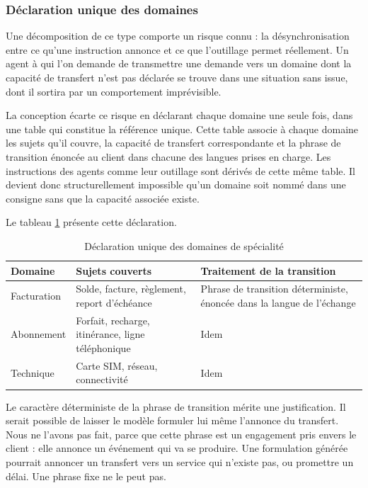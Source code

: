 \subsubsection{Déclaration unique des domaines}

Une décomposition de ce type comporte un risque connu : la désynchronisation entre ce qu'une instruction annonce et ce que l'outillage permet réellement. Un agent à qui l'on demande de transmettre une demande vers un domaine dont la capacité de transfert n'est pas déclarée se trouve dans une situation sans issue, dont il sortira par un comportement imprévisible.

La conception écarte ce risque en déclarant chaque domaine une seule fois, dans une table qui constitue la référence unique. Cette table associe à chaque domaine les sujets qu'il couvre, la capacité de transfert correspondante et la phrase de transition énoncée au client dans chacune des langues prises en charge. Les instructions des agents comme leur outillage sont dérivés de cette même table. Il devient donc structurellement impossible qu'un domaine soit nommé dans une consigne sans que la capacité associée existe.

Le tableau \ref{tab:domaines} présente cette déclaration.

\begin{table}[H]
\centering
\renewcommand{\arraystretch}{1.25}
\begin{tabular}{|p{3.0cm}|p{6.2cm}|p{5.3cm}|}
\hline
\textbf{Domaine} & \textbf{Sujets couverts} & \textbf{Traitement de la transition} \\
\hline
Facturation & Solde, facture, règlement, report d'échéance & Phrase de transition déterministe, énoncée dans la langue de l'échange \\
\hline
Abonnement & Forfait, recharge, itinérance, ligne téléphonique & Idem \\
\hline
Technique & Carte SIM, réseau, connectivité & Idem \\
\hline
\end{tabular}
\caption{Déclaration unique des domaines de spécialité}
\label{tab:domaines}
\end{table}

Le caractère déterministe de la phrase de transition mérite une justification. Il serait possible de laisser le modèle formuler lui même l'annonce du transfert. Nous ne l'avons pas fait, parce que cette phrase est un engagement pris envers le client : elle annonce un événement qui va se produire. Une formulation générée pourrait annoncer un transfert vers un service qui n'existe pas, ou promettre un délai. Une phrase fixe ne le peut pas.

